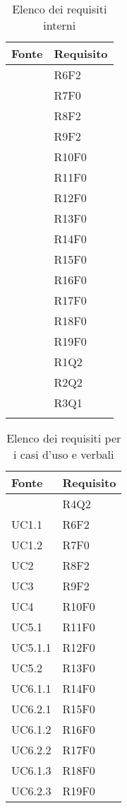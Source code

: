 		\begin{table}[H]
			\centering
			\begin{tabularx}{\textwidth}{YY}
				\textbf{Fonte} & \textbf{Requisito} \\
				\toprule
				 & R6F2 \\
				 & R7F0 \\
				 & R8F2 \\
				 & R9F2 \\
				 & R10F0 \\
				 & R11F0 \\
				 & R12F0 \\
				 & R13F0 \\
				 & R14F0 \\
				 & R15F0 \\
				 & R16F0 \\
				 & R17F0 \\
				 & R18F0 \\
				 & R19F0 \\
				 & R1Q2 \\
				 & R2Q2 \\
				  & R3Q1 \\
				\bottomrule \\
			\end{tabularx}
		\caption{Elenco dei requisiti interni}
	\end{table}

		\begin{table}[H]
			\centering
			\begin{tabularx}{\textwidth}{YY}
				\textbf{Fonte} & \textbf{Requisito} \\				
				\toprule
				 & R4Q2 \\
				UC1.1 & R6F2 \\
				UC1.2 & R7F0 \\
				UC2 & R8F2 \\
				UC3 & R9F2 \\
				UC4 & R10F0 \\
				UC5.1 & R11F0 \\
				UC5.1.1 & R12F0 \\
				UC5.2 & R13F0 \\
				UC6.1.1 & R14F0 \\
				UC6.2.1 & R15F0 \\
				UC6.1.2 & R16F0 \\
				UC6.2.2 & R17F0 \\
				UC6.1.3 & R18F0 \\
				UC6.2.3 & R19F0 \\
				\bottomrule
			\end{tabularx}
			\caption{Elenco dei requisiti per i casi d'uso e verbali}
		\end{table}
		
